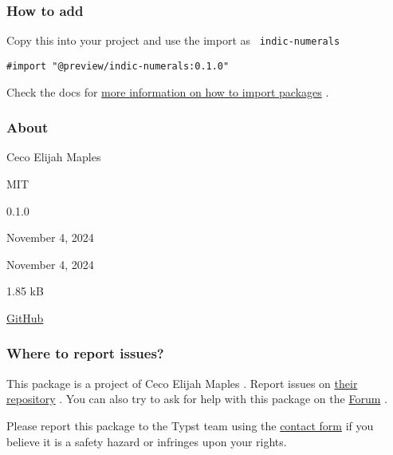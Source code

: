 \subsubsection{How to add}\label{how-to-add}

Copy this into your project and use the import as
\texttt{\ indic-numerals\ }

\begin{verbatim}
#import "@preview/indic-numerals:0.1.0"
\end{verbatim}



Check the docs for
\href{https://typst.app/docs/reference/scripting/\#packages}{more
information on how to import packages} .

\subsubsection{About}\label{about}

\begin{description}
\tightlist
\item[Author :]
Ceco Elijah Maples
\item[License:]
MIT
\item[Current version:]
0.1.0
\item[Last updated:]
November 4, 2024
\item[First released:]
November 4, 2024
\item[Archive size:]
1.85 kB
\href{https://packages.typst.org/preview/indic-numerals-0.1.0.tar.gz}{\pandocbounded{}}
\item[Repository:]
\href{https://github.com/cecoeco/indic-numerals}{GitHub}
\end{description}

\subsubsection{Where to report issues?}\label{where-to-report-issues}

This package is a project of Ceco Elijah Maples . Report issues on
\href{https://github.com/cecoeco/indic-numerals}{their repository} . You
can also try to ask for help with this package on the
\href{https://forum.typst.app}{Forum} .

Please report this package to the Typst team using the
\href{https://typst.app/contact}{contact form} if you believe it is a
safety hazard or infringes upon your rights.


